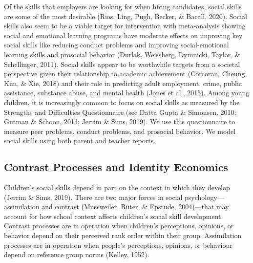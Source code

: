 \documentclass[
  english,
  man]{apa6}
\begin{document}
Of the skills that employers are looking for when hiring candidates, social skills are some of the most desirable (Rios, Ling, Pugh, Becker, \& Bacall, 2020). Social skills also seem to be a viable target for intervention with meta-analysis showing social and emotional learning programs have moderate effects on improving key social skills like reducing conduct problems and improving social-emotional learning skills and prosocial behavior (Durlak, Weissberg, Dymnicki, Taylor, \& Schellinger, 2011). Social skills appear to be worthwhile targets from a societal perspective given their relationship to academic achievement (Corcoran, Cheung, Kim, \& Xie, 2018) and their role in predicting adult employment, crime, public assistance, substance abuse, and mental health (Jones et al., 2015). Among young children, it is increasingly common to focus on social skills as measured by the Strengths and Difficulties Questionnaire (see Datta Gupta \& Simonsen, 2010; Gutman \& Schoon, 2013; Jerrim \& Sims, 2019). We use this questionnaire to measure peer problems, conduct problems, and prosocial behavior. We model social skills using both parent and teacher reports.

\hypertarget{contrast-processes-and-identity-economics}{%
\subsection{Contrast Processes and Identity Economics}\label{contrast-processes-and-identity-economics}}

Children's social skills depend in part on the context in which they develop (Jerrim \& Sims, 2019). There are two major forces in social psychology---assimilation and contrast (Mussweiler, Rüter, \& Epstude, 2004)---that may account for how school context affects children's social skill development. Contrast processes are in operation when children's perceptions, opinions, or behavior depend on their perceived rank order within their group. Assimilation processes are in operation when people's perceptions, opinions, or behaviour depend on reference group norms (Kelley, 1952).
\end{document}
